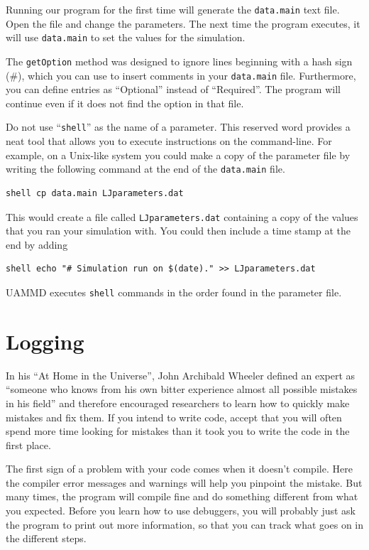 Running our program for the first time will generate the \texttt{data.main} text
file. Open the file and change the parameters. The next time the program
executes, it will use \texttt{data.main} to set the values for the simulation.

The \texttt{getOption} method was designed to ignore lines beginning with a hash
sign (\#), which you can use to insert comments in your \texttt{data.main} file.
Furthermore, you can define entries as ``Optional'' instead of ``Required''. The
program will continue even if it does not find the option in that file.

Do not use ``\texttt{shell}'' as the name of a parameter.  This reserved word 
provides a neat tool that allows you to execute instructions on the 
command-line. For example, on a Unix-like system you could make a copy of the 
parameter file by writing the following command at the end of the 
\texttt{data.main} file.
\begin{lstlisting}
shell cp data.main LJparameters.dat
\end{lstlisting}
This would create a file called \texttt{LJparameters.dat} containing a copy of 
the values that you ran your simulation with. You could then include a time 
stamp at the end by adding
\begin{lstlisting}
shell echo "# Simulation run on $(date)." >> LJparameters.dat
\end{lstlisting}
UAMMD executes \texttt{shell} commands in the order found in the parameter file.

\section{Logging}

In his ``At Home in the Universe'', John Archibald Wheeler defined an expert as
``someone who knows from his own bitter experience almost all possible mistakes
in his field'' and therefore encouraged researchers to learn how to quickly make
mistakes and fix them. If you intend to write code, accept that you will often
spend more time looking for mistakes than it took you to write the code in the
first place.

The first sign of a problem with your code comes when it doesn't compile. Here 
the compiler error messages and	warnings will help you pinpoint	the mistake. But 
many times, the program will compile fine and do something different from what 
you expected. Before you learn how to use debuggers, you will probably just ask 
the program to print out more information, so that you can track what goes on in 
the different steps.

